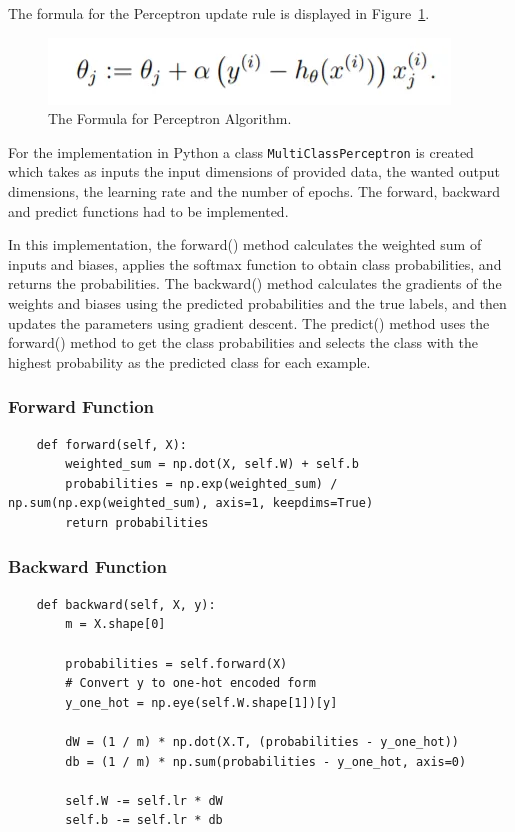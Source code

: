 \documentclass{CPSReport}
\begin{document}
The formula for the Perceptron update rule is displayed in Figure~\ref{fig:form_perceptron}.
\begin{figure}[ht]
    \centering
    \includegraphics[width=0.9\linewidth]{pics/perceptron_formula.png}
    \caption{The Formula for Perceptron Algorithm.}
    \label{fig:form_perceptron}
\end{figure}

For the implementation in Python a class \texttt{MultiClassPerceptron} is created which takes as inputs the input dimensions of provided data, the wanted output dimensions, the learning rate and the number of epochs. The forward, backward and predict functions had to be implemented.

In this implementation, the forward() method calculates the weighted sum of inputs and biases, applies the softmax function to obtain class probabilities, and returns the probabilities. The backward() method calculates the gradients of the weights and biases using the predicted probabilities and the true labels, and then updates the parameters using gradient descent. The predict() method uses the forward() method to get the class probabilities and selects the class with the highest probability as the predicted class for each example.

\subsubsection{Forward Function}
\begin{verbatim}
    def forward(self, X):
        weighted_sum = np.dot(X, self.W) + self.b
        probabilities = np.exp(weighted_sum) / np.sum(np.exp(weighted_sum), axis=1, keepdims=True)
        return probabilities
\end{verbatim}

\subsubsection{Backward Function}
\begin{verbatim}
    def backward(self, X, y):
        m = X.shape[0]

        probabilities = self.forward(X)
        # Convert y to one-hot encoded form
        y_one_hot = np.eye(self.W.shape[1])[y]

        dW = (1 / m) * np.dot(X.T, (probabilities - y_one_hot))
        db = (1 / m) * np.sum(probabilities - y_one_hot, axis=0)

        self.W -= self.lr * dW
        self.b -= self.lr * db
\end{verbatim}
\end{document}
